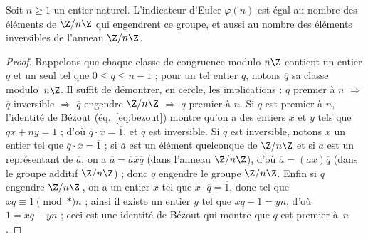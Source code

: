 \documentclass[11pt, useosf,
  title in boldface,
  theorem in new line,
  theorem numbering = section,
  number theorems separately,
]{simplivre}
\begin{document}
    \begin{proposition}\label{prop:indicateur d'Euler et Z/nZ}
        Soit \( n \geqslant 1 \) un entier naturel. L'indicateur d'Euler \( \varphi(n) \) est égal au nombre des éléments de \( \Z/n\Z \) qui engendrent ce groupe, et aussi au nombre des éléments inversibles de l'anneau \( \Z/n\Z \).
    \end{proposition}
    \begin{proof}
        Rappelons que chaque classe de congruence modulo \( n\Z \) contient un entier \( q \) et un seul tel que \( 0 \leqslant q \leqslant n-1 \) ; pour un tel entier \( q \), notons \( \overline{q} \) sa classe modulo~\( n\Z \). Il suffit de démontrer, en cercle, les implications : \( q \) premier à \( n \) \( \Rightarrow \) \( \overline{q} \) inversible \( \Rightarrow \) \( \overline{q} \) engendre \( \Z/n\Z \) \( \Rightarrow \) \( q \) premier à \( n \). Si \( q \) est premier à \( n \), l'identité de Bézout (éq.~\eqref{eq:bezout}) montre qu'on a des entiers \( x \) et \( y \) tels que \( qx+ny=1 \) ; d'où \( \overline{q} \cdot \overline{x} = \overline{1} \), et \( \overline{q} \) est inversible. Si \( \overline{q} \) est inversible, notons \( x \) un entier tel que \( \overline{q} \cdot \overline{x} = \overline{1} \) ; si \( \overline{a} \) est un élément quelconque de \( \Z/n\Z \) et si \( a \) est un représentant de \( \overline{a} \), on a \( \overline{a} = \overline{a} \overline{x} \overline{q} \) (dans l'anneau \( \Z/n\Z \)), d'où \( \overline{a} = (ax) \overline{q} \) (dans le groupe additif \( \Z/n\Z \)) ; donc \( \overline{q} \) engendre le groupe \( \Z/n\Z \). Enfin si \( \overline{q} \) engendre \( \Z/n\Z \)\,, on a un entier \( x \) tel que \( x \cdot \overline{q} = \overline{1} \), donc tel que \( xq \equiv 1 \pmod*{n} \) ; ainsi il existe un entier \( y \) tel que \( xq-1 = yn \), d'où \( 1 = xq-yn \) ; ceci est une identité de Bézout qui montre que \( q \) est premier à~\( n \).
    \end{proof}
\end{document}
